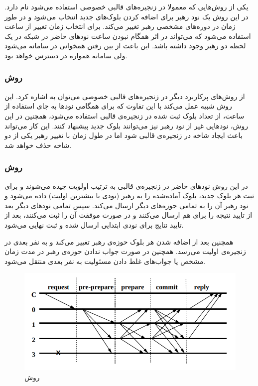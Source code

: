  یکی از روش‌هایی که معمولا در زنجیره‌های قالبی خصوصی استفاده می‌شود 
 \cite{Aura}
 نام دارد. در این روش یک نود رهبر برای اضافه کردن بلوک‌های جدید انتخاب می‌شود و در طور زمان در دوره‌های مشخصی رهبر تغییر می‌کند. برای انتخاب زمان تغییر از ساعت  استفاده می‌شود که می‌تواند در اثر همگام
 نبودن ساعت نود‌های حاضر در شبکه در یک لحظه دو رهبر وجود داشته باشد. این باعث از بین رفتن همخوانی در سامانه می‌شود ولی سامانه همواره در دسترس خواهد بود. 
\subsubsection{روش }
از روش‌های پرکاربرد دیگر در زنجیره‌های قالبی خصوصی می‌توان به 
 \cite{Clique}
 اشاره کرد. این روش شبیه  عمل می‌کند با این تفاوت که برای همگامی نودها به جای استفاده از ساعت، از تعداد بلوک ثبت شده در زنجیره‌ی قالبی استفاده می‌شود، همچنین در این روش، نود‌هایی غیر از نود رهبر نیز می‌توانند بلوک جدید پیشنهاد کنند. این کار می‌تواند باعث ایجاد شاخه‌ در زنجیره‌ی قالبی شود اما در طول زمان با تغییر رهبر یکی از دو شاخه حذف خواهد شد. 
 
 
 \subsubsection{روش }
 
 در این روش 
  \cite{PBFT}
 نود‌های حاضر در زنجیره‌ی قالبی به ترتیب اولویت چیده می‌شوند و برای ثبت هر بلوک جدید، بلوک آماده‌شده را به رهبر (نود‌ی با بیشترین اولیت) داده می‌شود و نود رهبر آن‌ را به تمامی حوزه‌های دیگر ارسال می‌کند. سپس تمامی نودهای دیگر بعد از تایید نتیجه را برای هم ارسال می‌کنند و در صورت موفقت آن را ثبت می‌کنند، بعد از تایید نتایج برای نود‌ی ابتدایی ارسال شده و ثبت نهایی می‌شود.
 \par
 همچنین بعد از اضافه شدن هر بلوک حوزه‌ی رهبر تغییر می‌کند و به نفر بعدی در زنجیره‌ی اولیت می‌رسد. همچنین در صورت جواب ندادن حوزه‌ی رهبر در مدت زمان مشخص یا جواب‌های غلط دادن مسئولیت به نفر بعدی منتقل می‌شود. 
 
 \begin{figure}[h!]
 	\centering
 	\includegraphics[width=1\linewidth]{PBFT.png}
 	\caption {روش }
 	\label{fig:PBFT}
 \end{figure}
 
